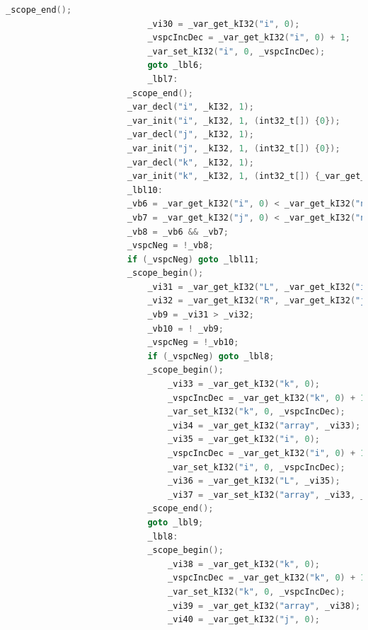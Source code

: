 \documentclass[a4paper]{article}
\begin{document}
\begin{lstlisting}[language=C]
                            _scope_end();
                            _vi30 = _var_get_kI32("i", 0);
                            _vspcIncDec = _var_get_kI32("i", 0) + 1;
                            _var_set_kI32("i", 0, _vspcIncDec);
                            goto _lbl6;
                            _lbl7:
                        _scope_end();
                        _var_decl("i", _kI32, 1);
                        _var_init("i", _kI32, 1, (int32_t[]) {0});
                        _var_decl("j", _kI32, 1);
                        _var_init("j", _kI32, 1, (int32_t[]) {0});
                        _var_decl("k", _kI32, 1);
                        _var_init("k", _kI32, 1, (int32_t[]) {_var_get_kI32("l", 0)});
                        _lbl10:
                        _vb6 = _var_get_kI32("i", 0) < _var_get_kI32("n1", 0);
                        _vb7 = _var_get_kI32("j", 0) < _var_get_kI32("n2", 0);
                        _vb8 = _vb6 && _vb7;
                        _vspcNeg = !_vb8;
                        if (_vspcNeg) goto _lbl11;
                        _scope_begin();
                            _vi31 = _var_get_kI32("L", _var_get_kI32("i", 0));
                            _vi32 = _var_get_kI32("R", _var_get_kI32("j", 0));
                            _vb9 = _vi31 > _vi32;
                            _vb10 = ! _vb9;
                            _vspcNeg = !_vb10;
                            if (_vspcNeg) goto _lbl8;
                            _scope_begin();
                                _vi33 = _var_get_kI32("k", 0);
                                _vspcIncDec = _var_get_kI32("k", 0) + 1;
                                _var_set_kI32("k", 0, _vspcIncDec);
                                _vi34 = _var_get_kI32("array", _vi33);
                                _vi35 = _var_get_kI32("i", 0);
                                _vspcIncDec = _var_get_kI32("i", 0) + 1;
                                _var_set_kI32("i", 0, _vspcIncDec);
                                _vi36 = _var_get_kI32("L", _vi35);
                                _vi37 = _var_set_kI32("array", _vi33, _vi36);
                            _scope_end();
                            goto _lbl9;
                            _lbl8:
                            _scope_begin();
                                _vi38 = _var_get_kI32("k", 0);
                                _vspcIncDec = _var_get_kI32("k", 0) + 1;
                                _var_set_kI32("k", 0, _vspcIncDec);
                                _vi39 = _var_get_kI32("array", _vi38);
                                _vi40 = _var_get_kI32("j", 0);

\end{lstlisting}
\end{document}
